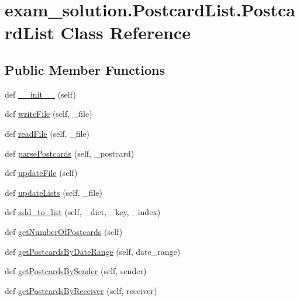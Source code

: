 \hypertarget{classexam__solution_1_1PostcardList_1_1PostcardList}{}\section{exam\+\_\+solution.\+Postcard\+List.\+Postcard\+List Class Reference}
\label{classexam__solution_1_1PostcardList_1_1PostcardList}
\subsection*{Public Member Functions}
\begin{DoxyCompactItemize}
\item 
def \mbox{\hyperlink{classexam__solution_1_1PostcardList_1_1PostcardList_a8a5134beb17641cbdc5c67be97cf0312}{\+\_\+\+\_\+init\+\_\+\+\_\+}} (self)
\item 
def \mbox{\hyperlink{classexam__solution_1_1PostcardList_1_1PostcardList_a560b7fa94c39e838c51d1630cf96357c}{write\+File}} (self, \+\_\+file)
\item 
def \mbox{\hyperlink{classexam__solution_1_1PostcardList_1_1PostcardList_a6cd8c12f1e3a2da78f0290eef2a21261}{read\+File}} (self, \+\_\+file)
\item 
def \mbox{\hyperlink{classexam__solution_1_1PostcardList_1_1PostcardList_acebfaabbe6000634ecfdac02406865b8}{parse\+Postcards}} (self, \+\_\+postcard)
\item 
def \mbox{\hyperlink{classexam__solution_1_1PostcardList_1_1PostcardList_ad7a33de753fb6551b71308119da12c64}{update\+File}} (self)
\item 
def \mbox{\hyperlink{classexam__solution_1_1PostcardList_1_1PostcardList_a65f45ac00037f579570663953956f5f0}{update\+Lists}} (self, \+\_\+file)
\item 
def \mbox{\hyperlink{classexam__solution_1_1PostcardList_1_1PostcardList_af8499fa67fcf60709c791f8fcfed4004}{add\+\_\+to\+\_\+list}} (self, \+\_\+dict, \+\_\+key, \+\_\+index)
\item 
def \mbox{\hyperlink{classexam__solution_1_1PostcardList_1_1PostcardList_ae8a04db1a0fb41601dcf30c6c771f849}{get\+Number\+Of\+Postcards}} (self)
\item 
def \mbox{\hyperlink{classexam__solution_1_1PostcardList_1_1PostcardList_a58aaec779048c09830906e010227da02}{get\+Postcards\+By\+Date\+Range}} (self, date\+\_\+range)
\item 
def \mbox{\hyperlink{classexam__solution_1_1PostcardList_1_1PostcardList_aea2d6822e4b9dd4182502f44e1a25e2d}{get\+Postcards\+By\+Sender}} (self, sender)
\item 
def \mbox{\hyperlink{classexam__solution_1_1PostcardList_1_1PostcardList_a06dfdb659c6ca3927398930b11fd3da1}{get\+Postcards\+By\+Receiver}} (self, receiver)
\end{DoxyCompactItemize}


